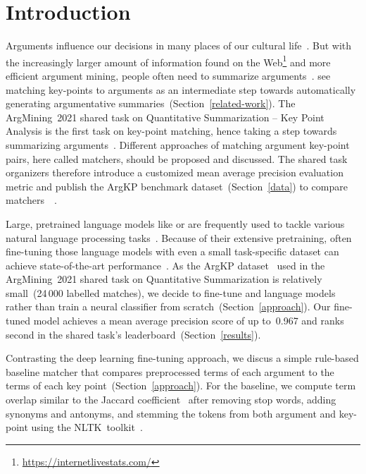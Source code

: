 \section{Introduction}\label{introduction}

Arguments influence our decisions in many places of our cultural life~\cite{Bar-HaimEFKLS2020}.
But with the increasingly larger amount of information found on the Web\footnote{\url{https://internetlivestats.com/}} and more efficient argument mining, people often need to summarize arguments~\cite{LawrenceR2019,Bar-HaimEFKLS2020}.
\citet{Bar-HaimEFKLS2020} see matching key-points to arguments as an intermediate step towards automatically generating argumentative summaries~(Section~\ref{related-work}).
The ArgMining~2021 shared task on Quantitative Summarization -- Key Point Analysis is the first task on key-point matching, hence taking a step towards summarizing arguments~\todocite.
Different approaches of matching argument key-point pairs, here called matchers, should be proposed and discussed.
The shared task organizers therefore introduce a customized mean average precision evaluation metric and publish the ArgKP benchmark dataset~(Section~\ref{data}) to compare matchers~\todocite~\cite{Bar-HaimEFKLS2020}.

Large, pretrained language models like \Bert or \Roberta are frequently used to tackle various natural language processing tasks~\cite{DevlinCLT2019,LiuOGDJCLLZS2019}. 
Because of their extensive pretraining, often fine-tuning those language models with even a small task-specific dataset can achieve state-of-the-art performance~\todocite.
As the ArgKP dataset~\cite{Bar-HaimEFKLS2020} used in the ArgMining~2021 shared task on Quantitative Summarization is relatively small~(24\,000 labelled matches), we decide to fine-tune \Bert and \Roberta language models rather than train a neural classifier from scratch~(Section~\ref{approach}).
Our fine-tuned \RobertaBase model achieves a mean average precision score of up to~0.967 and ranks second in the shared task's leaderboard~(Section~\ref{results}).

Contrasting the deep learning fine-tuning approach, we discus a simple rule-based baseline matcher that compares preprocessed terms of each argument to the terms of each key point~(Section~\ref{approach}). For the baseline, we compute term overlap similar to the Jaccard coefficient~\cite{Jaccard1902} after removing stop words, adding synonyms and antonyms, and stemming the tokens from both argument and key-point using the NLTK~toolkit~\cite{BirdL2004}.